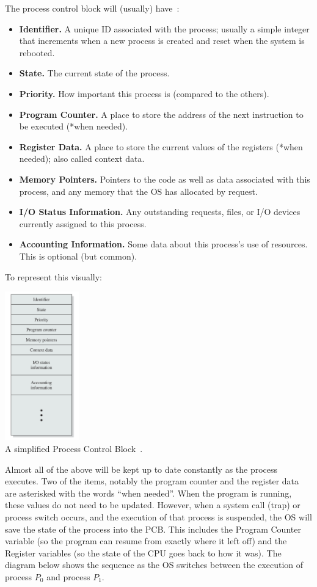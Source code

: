 The process control block will (usually) have~\cite{osi}:
\begin{itemize}
	\item \textbf{Identifier.} A unique ID associated with the process; usually a simple integer that increments when a new process is created and reset when the system is rebooted.
	\item \textbf{State.} The current state of the process.
	\item \textbf{Priority.} How important this process is (compared to the others).
	\item \textbf{Program Counter.} A place to store the address of the next instruction to be executed (*when needed).
	\item \textbf{Register Data.} A place to store the current values of the registers (*when needed); also called context data.
	\item \textbf{Memory Pointers.} Pointers to the code as well as data associated with this process, and any memory that the OS has allocated by request.
	\item \textbf{I/O Status Information.} Any outstanding requests, files, or I/O devices currently assigned to this process.
	\item \textbf{Accounting Information.} Some data about this process's use of resources. This is optional (but common).
\end{itemize}

To represent this visually:

\begin{center}
	\includegraphics[width=0.24\textwidth]{images/pcb.png}\\
	A simplified Process Control Block~\cite{osi}.
\end{center}

Almost all of the above will be kept up to date constantly as the process executes.  Two of the items, notably the program counter and the register data are asterisked with the words ``when needed''. When the program is running, these values do not need to be updated. However, when a system call (trap) or process switch occurs, and the execution of that process is suspended, the OS will save the state of the process into the PCB. This includes the Program Counter variable (so the program can resume from exactly where it left off) and the Register variables (so the state of the CPU goes back to how it was). The diagram below shows the sequence as the OS switches between the execution of process $P_{0}$ and process $P_{1}$.

